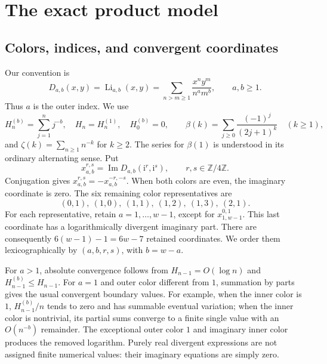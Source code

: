 \documentclass[11pt,a4paper]{article}
\numberwithin{equation}{section}
\theoremstyle{definition}\newtheorem{definition}[theorem]{Definition}
\theoremstyle{remark}\newtheorem{remark}[theorem]{Remark}
\newcommand{\Z}{\mathbb Z}
\newcommand{\ii}{\mathrm i}
\newcommand{\Li}{\operatorname{Li}}
\newcommand{\Imag}{\operatorname{Im}}
\begin{document}
\section{The exact product model}
\label{sec:model}
\subsection{Colors, indices, and convergent coordinates}
Our convention is
\begin{equation}
D_{a,b}(x,y)=\Li_{a,b}(x,y)
 =\sum_{n>m\ge1}\frac{x^ny^m}{n^a m^b},\qquad a,b\ge1.
\label{eq:series}
\end{equation}
Thus $a$ is the outer index. We use
\[
H_n^{(b)}=\sum_{j=1}^n j^{-b},\quad H_n=H_n^{(1)},\quad H_0^{(b)}=0,
\qquad \beta(k)=\sum_{j\ge0}\frac{(-1)^j}{(2j+1)^k}\quad(k\ge1),
\]
and $\zeta(k)=\sum_{n\ge1}n^{-k}$ for $k\ge2$.
The series for $\beta(1)$ is understood in its ordinary alternating sense.
Put
\[
x_{a,b}^{r,s}=\Imag D_{a,b}(\ii^r,\ii^s),\qquad r,s\in\Z/4\Z.
\]
Conjugation gives $x_{a,b}^{r,s}=-x_{a,b}^{-r,-s}$. When both colors are even,
the imaginary coordinate is zero. The six remaining color representatives are
\begin{equation}
(0,1),\ (1,0),\ (1,1),\ (1,2),\ (1,3),\ (2,1).
\label{eq:colors}
\end{equation}
For each representative, retain $a=1,\ldots,w-1$, except for
$x_{1,w-1}^{0,1}$. This last coordinate has a logarithmically divergent
imaginary part. There are consequently $6(w-1)-1=6w-7$ retained coordinates.
We order them lexicographically by $(a,b,r,s)$, with $b=w-a$.

For $a>1$, absolute convergence follows from
$H_{n-1}=O(\log n)$ and $H_{n-1}^{(b)}\le H_{n-1}$.
For $a=1$ and outer color different from $1$, summation by parts gives the
usual convergent boundary values. For example, when the inner color is $1$,
$H_{n-1}^{(b)}/n$ tends to zero and has summable eventual variation; when the
inner color is nontrivial, its partial sums converge to a finite single value
with an $O(n^{-b})$ remainder. The exceptional outer color $1$ and imaginary
inner color produces the removed logarithm. Purely real divergent expressions
are not assigned finite numerical values: their imaginary equations are
simply zero.
\end{document}
